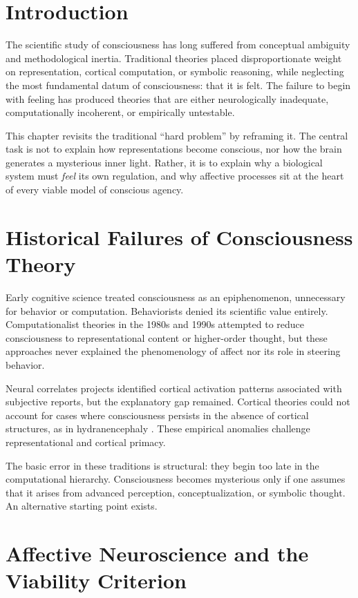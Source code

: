 \documentclass[12pt,oneside]{book}
\theoremstyle{plain}
\theoremstyle{definition}
\let\citep\parencite
\begin{document}
\section{Introduction}

The scientific study of consciousness has long suffered from conceptual
ambiguity and methodological inertia.
Traditional theories placed disproportionate weight on
representation, cortical computation, or symbolic reasoning, while
neglecting the most fundamental datum of consciousness: that it is felt.
The failure to begin with feeling has produced theories that
are either neurologically inadequate, computationally incoherent, or
empirically untestable.

This chapter revisits the traditional ``hard problem'' by reframing it.
The central task is not to explain how representations become conscious,
nor how the brain generates a mysterious inner light.
Rather, it is to explain why a biological system must
\emph{feel} its own regulation, and why affective processes sit at the
heart of every viable model of conscious agency.

\section{Historical Failures of Consciousness Theory}

Early cognitive science treated consciousness as an epiphenomenon,
unnecessary for behavior or computation.
Behaviorists denied its scientific value entirely.
Computationalist theories in the 1980s and 1990s attempted to reduce
consciousness to representational content or higher-order thought, but
these approaches never explained the phenomenology of affect nor its
role in steering behavior.

Neural correlates projects identified cortical activation patterns
associated with subjective reports, but the explanatory gap remained.
Cortical theories could not account for cases where consciousness persists in
the absence of cortical structures, as in hydranencephaly
\citep{merker2007consciousness,solms2021hidden}.
These empirical anomalies challenge representational and cortical primacy.

The basic error in these traditions is structural:
they begin too late in the computational hierarchy.
Consciousness becomes mysterious only if one assumes that it arises
from advanced perception, conceptualization, or symbolic thought.
An alternative starting point exists.

\section{Affective Neuroscience and the Viability Criterion}
\end{document}
